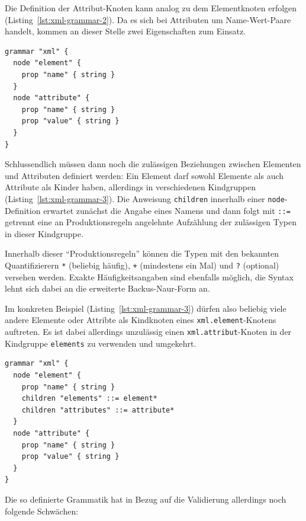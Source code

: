 \documentclass[paper=a4,fontsize=11pt,parskip=half]{scrartcl}
\begin{document}
Die Definition der Attribut-Knoten kann analog zu dem Elementknoten erfolgen (Listing~\ref{lst:xml-grammar-2}). Da es sich bei Attributen um Name-Wert-Paare handelt, kommen an dieser Stelle zwei Eigenschaften zum Einsatz.

\begin{lstlisting}[float=h, label={lst:xml-grammar-2},caption={\texttt{XML} Schritt 2 - Elemente mit Namen, Attribute mit Schlüssel-Wert-Paaren},captionpos=b,language={Grammar}]
grammar "xml" {
  node "element" {
    prop "name" { string }
  }
  node "attribute" {
    prop "name" { string }
    prop "value" { string }
  }
}
\end{lstlisting}

Schlussendlich müssen dann noch die zulässigen Beziehungen zwischen Elementen und Attributen definiert werden: Ein Element darf sowohl Elemente als auch Attribute als Kinder haben, allerdings in verschiedenen Kindgruppen (Listing~\ref{lst:xml-grammar-3}). Die Anweisung \texttt{children} innerhalb einer \texttt{node}-Definition erwartet zunächst die Angabe eines Namens und dann folgt mit \texttt{::=} getrennt eine an Produktionsregeln angelehnte Aufzählung der zulässigen Typen in dieser Kindgruppe.

Innerhalb dieser \enquote{Produktionsregeln} können die Typen mit den bekannten Quantifizierern \texttt{*} (beliebig häufig), \texttt{+} (mindestens ein Mal) und \texttt{?} (optional) versehen werden. Exakte Häufigkeitsangaben sind ebenfalls möglich, die Syntax lehnt sich dabei an die erweiterte Backus-Naur-Form an.

Im konkreten Beispiel (Listing~\ref{lst:xml-grammar-3}) dürfen also beliebig viele andere Elemente oder Attribte als Kindknoten eines \texttt{xml.element}-Knotens auftreten. Es ist dabei allerdings unzulässig einen \texttt{xml.attribut}-Knoten in der Kindgruppe \texttt{elements} zu verwenden und umgekehrt.

\begin{lstlisting}[float=h, label={lst:xml-grammar-3},caption={\texttt{XML} Schritt 3 - Beziehungen zwischen Elementen und Attributen},captionpos=b,language={Grammar}]
grammar "xml" {
  node "element" {
    prop "name" { string }
    children "elements" ::= element*
    children "attributes" ::= attribute*
  }
  node "attribute" {
    prop "name" { string }
    prop "value" { string }
  }
}
\end{lstlisting}

Die so definierte Grammatik hat in Bezug auf die Validierung allerdings noch folgende Schwächen:
\end{document}
